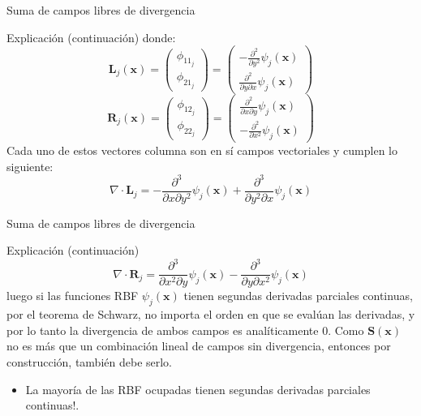 \documentclass{beamer}
\begin{document}
\begin{frame}{Suma de campos libres de divergencia}
  \begin{block}{Explicación (continuación)}
  donde:
  $$
  \mathbf{L}_j(\mathbf{x})=\begin{pmatrix} \phi_{11_{j}} \\ \phi_{21_{j}} \end{pmatrix} =
  \begin{pmatrix} -\frac{\partial^2}{\partial y^2}\psi_{j}(\mathbf{x}) \\
  \frac{\partial^2}{\partial y \partial x}  \psi_{j}(\mathbf{x}) \end{pmatrix}
  $$
  $$
  \mathbf{R}_j(\mathbf{x})=\begin{pmatrix} \phi_{12_{j}} \\ \phi_{22_{j}} \end{pmatrix} =
  \begin{pmatrix} \frac{\partial^2}{\partial x \partial y}  \psi_{j}(\mathbf{x})  \\
  -\frac{\partial^2}{\partial x^2}\psi_{j}(\mathbf{x})
   \end{pmatrix}
  $$
  Cada uno de estos vectores columna son en sí campos vectoriales y cumplen lo siguiente:
  $$
  \nabla \cdot \mathbf{L}_j =
  -\frac{\partial^3}{\partial x \partial y^2} \psi_{j}(\mathbf{x}) + \frac{\partial^3}{\partial y^2 \partial x} \psi_{j}(\mathbf{x})
  $$

  \end{block}
\end{frame}

\begin{frame}{Suma de campos libres de divergencia}
  \begin{block}{Explicación (continuación)}
  $$
  \nabla \cdot \mathbf{R}_j =
  \frac{\partial^3}{\partial x^2 \partial y} \psi_{j}(\mathbf{x}) -\frac{\partial^3}{\partial y \partial x^2} \psi_{j}(\mathbf{x})
  $$
  luego si las funciones RBF $\psi_{j}(\mathbf{x})$ tienen segundas derivadas parciales continuas, por el teorema de Schwarz, no importa
  el orden en que se evalúan las derivadas, y por lo tanto la divergencia de ambos campos es analíticamente $0$. Como
  $\mathbf{S}(\mathbf{x})$ no es más que un combinación lineal de campos sin divergencia, entonces por construcción, también debe serlo.
  \end{block}

  \begin{itemize}
    \item La mayoría de las RBF ocupadas tienen segundas derivadas parciales continuas!.
  \end{itemize}
\end{frame}
\end{document}
